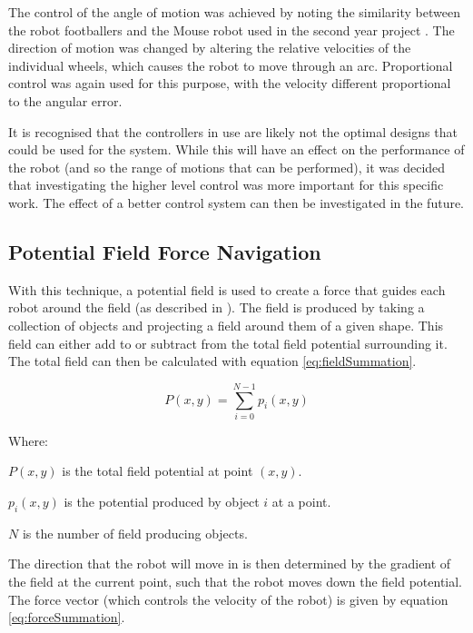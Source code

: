 \documentclass[10pt]{article} \usepackage[a4paper]{geometry}
\begin{document}
The control of the angle of motion was achieved by noting the similarity between
the robot footballers and the Mouse robot used in the second year project
\cite{mouseProjectReport}.  The direction of motion was changed by altering the
relative velocities of the individual wheels, which causes the robot to move
through an arc.  Proportional control was again used for this purpose, with the
velocity different proportional to the angular error.

It is recognised that the controllers in use are likely not the optimal designs
that could be used for the system.  While this will have an effect on the
performance of the robot (and so the range of motions that can be performed), it
was decided that investigating the higher level control was more important for
this specific work.  The effect of a better control system can then be
investigated in the future.

\subsection{Potential Field Force Navigation\label{sub:Potential-Field-Force}}

With this technique, a potential field is used to create a force that guides
each robot around the field (as described in
\cite{intelligentAlgorithmPathPlanning}). The field is produced by taking a
collection of objects and projecting a field around them of a given shape. This
field can either add to or subtract from the total field potential surrounding
it. The total field can then be calculated with equation
\ref{eq:fieldSummation}.

\begin{equation}
P(x,y)=\sum_{i=0}^{N-1}p_{i}\left(x,y\right)\label{eq:fieldSummation}
\end{equation}

Where:

$P\left(x,y\right)$ is the total field potential at point $\left(x,y\right)$.

$p_{i}\left(x,y\right)$ is the potential produced by object $i$ at a point.

$N$ is the number of field producing objects.

The direction that the robot will move in is then determined by the gradient of
the field at the current point, such that the robot moves down the field
potential. The force vector (which controls the velocity of the robot) is given
by equation \ref{eq:forceSummation}.
\end{document}
